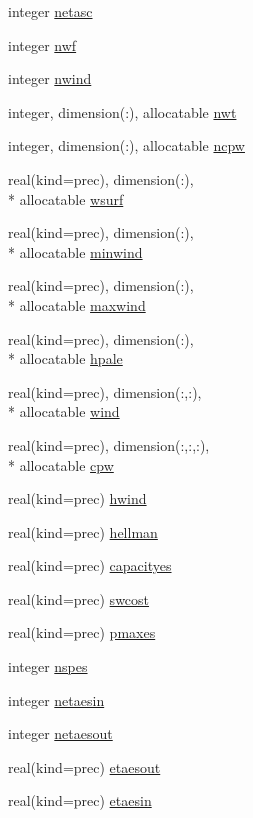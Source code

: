 \begin{DoxyCompactItemize}
\item 
integer \hyperlink{classinputvar_a803bd9bf1eb3b3aaa4e498bbad5c89c9}{netasc}
\item 
integer \hyperlink{classinputvar_a1da1d97ed067b07a4a7717bffd2552ee}{nwf}
\item 
integer \hyperlink{classinputvar_a02de598dd9d979229fdb815b3fbfcd04}{nwind}
\item 
integer, dimension(\-:), allocatable \hyperlink{classinputvar_a33759b5d3ac0ed8e83e2a56028668bc5}{nwt}
\item 
integer, dimension(\-:), allocatable \hyperlink{classinputvar_a58640e3824c5fa77d6d108cf97b7a0bc}{ncpw}
\item 
real(kind=prec), dimension(\-:), \\*
allocatable \hyperlink{classinputvar_a14476d610b1d64d08f3681482a8e82b8}{wsurf}
\item 
real(kind=prec), dimension(\-:), \\*
allocatable \hyperlink{classinputvar_abb9cb8ca38b7592b52f30836a6755584}{minwind}
\item 
real(kind=prec), dimension(\-:), \\*
allocatable \hyperlink{classinputvar_a42a243861fa635356cdd79a587633909}{maxwind}
\item 
real(kind=prec), dimension(\-:), \\*
allocatable \hyperlink{classinputvar_a1a0e84530e6db6a46aabfcea51b086bf}{hpale}
\item 
real(kind=prec), dimension(\-:,\-:), \\*
allocatable \hyperlink{classinputvar_a984abc6260080087c3c555784481627d}{wind}
\item 
real(kind=prec), dimension(\-:,\-:,\-:), \\*
allocatable \hyperlink{classinputvar_aa5889e6180140933c4866b2e05765458}{cpw}
\item 
real(kind=prec) \hyperlink{classinputvar_aef589b7d9f863ca157c6d7921781fe58}{hwind}
\item 
real(kind=prec) \hyperlink{classinputvar_ad9ba538cb5982defe216a14bc80bf73e}{hellman}
\item 
real(kind=prec) \hyperlink{classinputvar_a4160798c67ffa5c237c6a3febf2eb38f}{capacityes}
\item 
real(kind=prec) \hyperlink{classinputvar_aa9cd3592e06c1cfdc7fee2caf5b13d1f}{swcost}
\item 
real(kind=prec) \hyperlink{classinputvar_a424224e3c5687c72c624fa212df200b4}{pmaxes}
\item 
integer \hyperlink{classinputvar_a253d7296c6c1f21cd53ed05721bcbbc3}{nspes}
\item 
integer \hyperlink{classinputvar_a5ded7ede4ce21d0a98a8055d9af0d827}{netaesin}
\item 
integer \hyperlink{classinputvar_ae8e6041b9d65c592b4ac141f652ca7e0}{netaesout}
\item 
real(kind=prec) \hyperlink{classinputvar_a3b0799d84e3b3f626084c324e6b2a699}{etaesout}
\item 
real(kind=prec) \hyperlink{classinputvar_abd4dda94e6c1b4279f7b987b00a1944b}{etaesin}
\end{DoxyCompactItemize}



